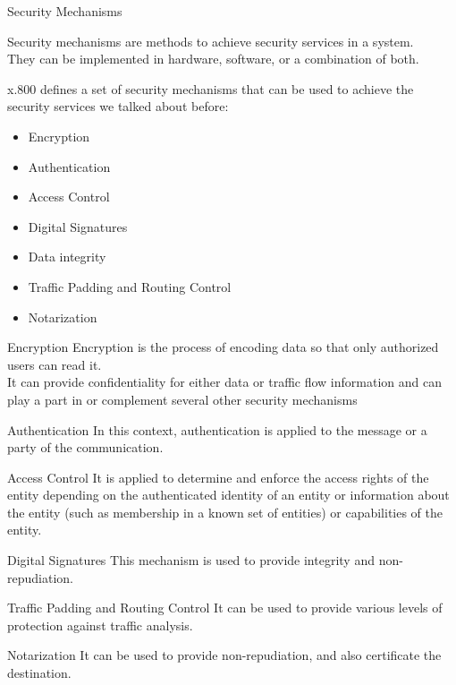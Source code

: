 \begin{section}{Security Mechanisms}
  \begin{boxH}
    Security mechanisms are methods to achieve security services in a system.\\
    They can be implemented in hardware, software, or a combination of both.
  \end{boxH}
  x.800 defines a set of security mechanisms that can be used to achieve the security services
  we talked about before:
  \begin{itemize}
    \item Encryption
    \item Authentication
    \item Access Control
    \item Digital Signatures
    \item Data integrity
    \item Traffic Padding and Routing Control
    \item Notarization
  \end{itemize}
  \begin{paragraph}{Encryption}
    Encryption is the process of encoding data so that only authorized users can read it.\\
    It can provide confidentiality for either data or traffic flow information and can play a part 
    in or complement several other security mechanisms
  \end{paragraph}
  \begin{paragraph}{Authentication}
    In this context, authentication is applied to the message or a party of the communication.\\
  \end{paragraph}
  \begin{paragraph}{Access Control}
    It is applied to determine and enforce the access rights of the entity depending on the 
    authenticated identity of an entity or information about the entity (such as membership in a 
    known set of entities) or capabilities of the entity.
  \end{paragraph}
  \begin{paragraph}{Digital Signatures}
    This mechanism is used to provide integrity and non-repudiation.
  \end{paragraph}
  \begin{paragraph}{Traffic Padding and Routing Control}
    It can be used to provide various levels of protection against traffic analysis.
  \end{paragraph}
  \begin{paragraph}{Notarization}
    It can be used to provide non-repudiation, and also certificate the destination.
  \end{paragraph}
\end{section}
